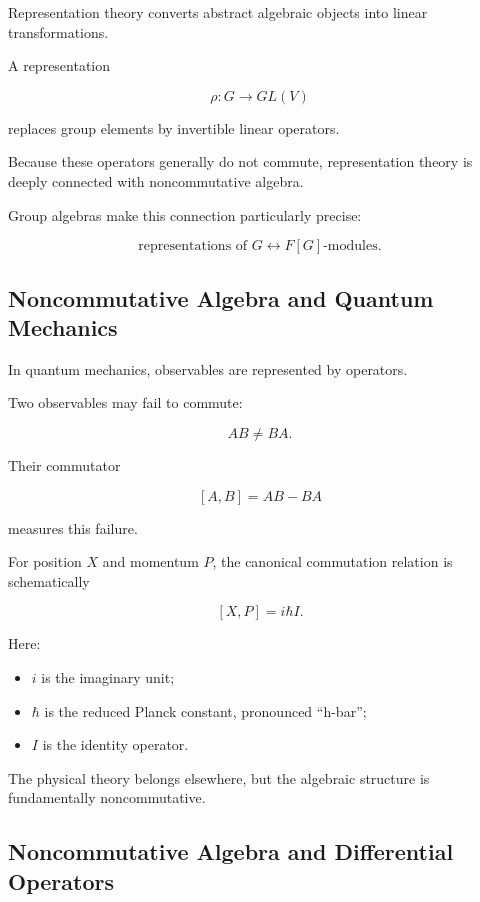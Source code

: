 Representation theory converts abstract algebraic objects into linear
transformations.

A representation

\[ \rho:G\to GL(V) \]

replaces group elements by invertible linear operators.

Because these operators generally do not commute, representation theory is
deeply connected with noncommutative algebra.

Group algebras make this connection particularly precise:

\[ \text{representations of }G
\longleftrightarrow
F[G]\text{-modules}. \]

\subsection{Noncommutative Algebra and Quantum Mechanics}
\label{subsec:noncommutative-quantum}

In quantum mechanics, observables are represented by operators.

Two observables may fail to commute:

\[ AB\neq BA. \]

Their commutator

\[ [A,B]=AB-BA \]

measures this failure.

For position \(X\) and momentum \(P\), the canonical commutation relation is
schematically

\[ [X,P]=i\hbar I. \]

Here:

\begin{itemize}
    \item \(i\) is the imaginary unit;
    \item \(\hbar\) is the reduced Planck constant, pronounced
    ``h-bar'';
    \item \(I\) is the identity operator.
\end{itemize}

The physical theory belongs elsewhere, but the algebraic structure is
fundamentally noncommutative.

\subsection{Noncommutative Algebra and Differential Operators}
\label{subsec:noncommutative-differential-operators}


